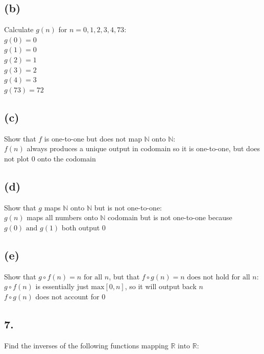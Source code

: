 \documentclass[11pt]{article}
\begin{document}
\subsection*{(b)}
\begin{center}
Calculate $g(n)$ for $n = 0,1,2,3,4,73$:\\
\hfill \break
$g(0) = 0$\\
$g(1) = 0$\\
$g(2) = 1$\\
$g(3) = 2$\\
$g(4) = 3$\\
$g(73) = 72$\\
\end{center}

\subsection*{(c)}
\begin{center}
Show that $f$ is one-to-one but does not map $\mathbb{N} \text{ onto } \mathbb{N}$:\\
\hfill \break
$f(n)$ always produces a unique output in codomain so it is one-to-one, but does not plot $0$ onto the codomain
\end{center}

\subsection*{(d)}
\begin{center}
Show that $g$ maps $\mathbb{N} \text{ onto } \mathbb{N}$ but is not one-to-one:\\
\hfill \break
$g(n)$ maps all numbers onto $\mathbb{N}$ codomain but is not one-to-one because $g(0) \text{ and } g(1)$ both output $0$
\end{center}

\subsection*{(e)}
\begin{center}
Show that $g \circ f(n) = n \text{ for all } n$, but that $f \circ g(n) = n \text{ does not hold for all } n$:\\
\hfill \break
$g \circ f(n)$ is essentially just $\text{max}[0,n]$, so it will output back $n$\\
$f \circ g(n)$ does not account for $0$
\end{center}
%
%
\subsection*{7.}
\begin{center}
Find the inverses of the following functions mapping  $\mathbb{R} \text{ into } \mathbb{R}$: 
\end{center}
\end{document}
